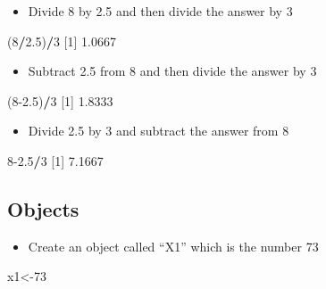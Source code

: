 \documentclass[
]{book}
\newenvironment{Shaded}{\begin{snugshade}}{\end{snugshade}}
\newcommand{\DecValTok}[1]{\textcolor[rgb]{0.00,0.00,0.81}{#1}}
\newcommand{\FloatTok}[1]{\textcolor[rgb]{0.00,0.00,0.81}{#1}}
\newcommand{\NormalTok}[1]{#1}
\newcommand{\OperatorTok}[1]{\textcolor[rgb]{0.81,0.36,0.00}{\textbf{#1}}}
\providecommand{\tightlist}{%
  \setlength{\itemsep}{0pt}\setlength{\parskip}{0pt}}
\begin{document}
\begin{itemize}
\tightlist
\item
  Divide 8 by 2.5 and then divide the answer by 3
\end{itemize}

\begin{Shaded}
\begin{Highlighting}[]
\NormalTok{(}\DecValTok{8}\OperatorTok{/}\FloatTok{2.5}\NormalTok{)}\OperatorTok{/}\DecValTok{3}
\NormalTok{[}\DecValTok{1}\NormalTok{] }\FloatTok{1.0667}
\end{Highlighting}
\end{Shaded}

\begin{itemize}
\tightlist
\item
  Subtract 2.5 from 8 and then divide the answer by 3
\end{itemize}

\begin{Shaded}
\begin{Highlighting}[]
\NormalTok{(}\DecValTok{8}\FloatTok{-2.5}\NormalTok{)}\OperatorTok{/}\DecValTok{3}
\NormalTok{[}\DecValTok{1}\NormalTok{] }\FloatTok{1.8333}
\end{Highlighting}
\end{Shaded}

\begin{itemize}
\tightlist
\item
  Divide 2.5 by 3 and subtract the answer from 8
\end{itemize}

\begin{Shaded}
\begin{Highlighting}[]
\DecValTok{8}\FloatTok{-2.5}\OperatorTok{/}\DecValTok{3}       
\NormalTok{[}\DecValTok{1}\NormalTok{] }\FloatTok{7.1667}
\end{Highlighting}
\end{Shaded}

\hypertarget{objects-2}{%
\subsection{Objects}\label{objects-2}}

\begin{itemize}
\tightlist
\item
  Create an object called ``X1'' which is the number 73
\end{itemize}

\begin{Shaded}
\begin{Highlighting}[]
\NormalTok{x1<-}\DecValTok{73}       
\end{Highlighting}
\end{Shaded}
\end{document}
